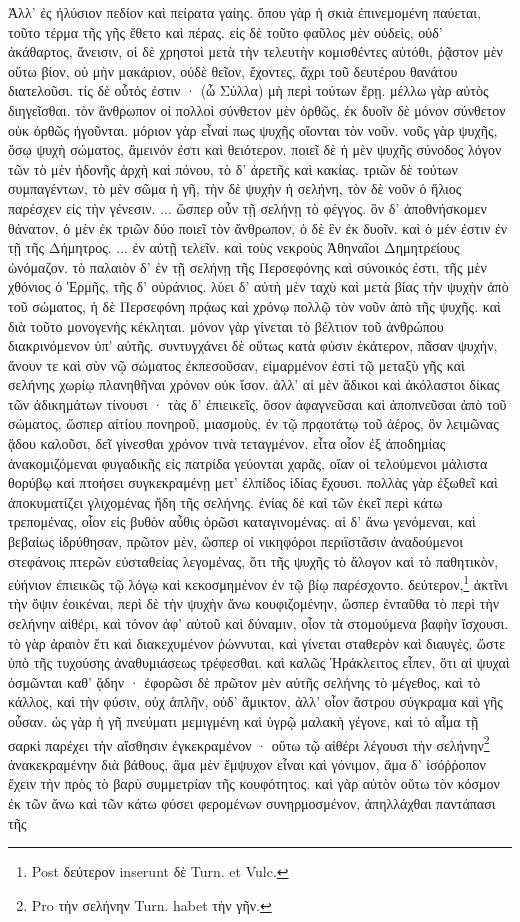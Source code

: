 \documentclass[a4paper, 11pt, oneside, polutonikogreek, german]{article}
\begin{document}
Ἀλλ' ἐς ἠλύσιον πεδίον καὶ πείρατα γαίης. ὅπου γὰρ ἡ σκιὰ ἐπινεμομένη παύεται, τοῦτο τέρμα τῆς γῆς ἔθετο καὶ πέρας. εἰς δὲ τοῦτο φαῦλος μὲν οὐδεὶς, οὐδ' ἀκάθαρτος, ἄνεισιν, οἱ δὲ χρηστοὶ μετὰ τὴν τελευτὴν κομισθέντες αὐτόθι, ῥᾷστον μὲν οὕτω βίον, οὐ μὴν μακάριον, οὐδὲ θεῖον, ἔχοντες, ἄχρι τοῦ δευτέρου θανάτου διατελοῦσι. τίς δὲ οὗτός ἐστιν · (ὦ Σύλλα) μὴ περὶ τούτων ἔρῃ. μέλλω γὰρ αὐτὸς διηγεῖσθαι. τὸν ἄνθρωπον οἱ πολλοὶ σύνθετον μὲν ὀρθῶς, ἐκ δυοῖν δὲ μόνον σύνθετον οὐκ ὀρθῶς ἡγοῦνται. μόριον γὰρ εἶναί πως ψυχῆς οἴονται τὸν νοῦν. νοῦς γὰρ ψυχῆς, ὅσῳ ψυχὴ σώματος, ἄμεινόν ἐστι καὶ θειότερον. ποιεῖ δὲ ἡ μὲν ψυχῆς σύνοδος λόγον τῶν τὸ μὲν ἡδονῆς ἀρχὴ καὶ πόνου, τὸ δ' ἀρετῆς καὶ κακίας. τριῶν δὲ τούτων συμπαγέντων, τὸ μὲν σῶμα ἡ γῆ, τὴν δὲ ψυχὴν ἡ σελήνη, τὸν δὲ νοῦν ὁ ἥλιος παρέσχεν εἰς τὴν γένεσιν. ... ὥσπερ οὖν τῇ σελήνῃ τὸ φέγγος. ὃν δ' ἀποθνήσκομεν θάνατον, ὁ μὲν ἐκ τριῶν δύο ποιεῖ τὸν ἄνθρωπον, ὁ δὲ ἓν ἐκ δυοῖν. καὶ ὁ μέν ἐστιν ἐν τῇ τῆς Δήμητρος. ... ἐν αὐτῇ τελεῖν. καὶ τοὺς νεκροὺς Ἀθηναῖοι Δημητρείους ὠνόμαζον. τὸ παλαιὸν δ' ἐν τῇ σελήνῃ τῆς Περσεφόνης καὶ σύνοικός ἐστι, τῆς μὲν χθόνιος ὁ Ἑρμῆς, τῆς δ' οὐράνιος. λύει δ' αὐτὴ μὲν ταχὺ καὶ μετὰ βίας τὴν ψυχὴν ἀπὸ τοῦ σώματος, ἡ δὲ Περσεφόνη πρᾴως καὶ χρόνῳ πολλῷ τὸν νοῦν ἀπὸ τῆς ψυχῆς. καὶ διὰ τοῦτο μονογενὴς κέκληται. μόνον γὰρ γίνεται τὸ βέλτιον τοῦ ἀνθρώπου διακρινόμενον ὑπ' αὐτῆς. συντυγχάνει δὲ οὕτως κατὰ φύσιν ἑκάτερον, πᾶσαν ψυχὴν, ἄνουν τε καὶ σὺν νῷ σώματος ἐκπεσοῦσαν, εἱμαρμένον ἐστὶ τῷ μεταξὺ γῆς καὶ σελήνης χωρίῳ πλανηθῆναι χρόνον οὐκ ἴσον. ἀλλ' αἱ μὲν ἄδικοι καὶ ἀκόλαστοι δίκας τῶν ἀδικημάτων τίνουσι · τὰς δ' ἐπιεικεῖς, ὅσον ἀφαγνεῦσαι καὶ ἀποπνεῦσαι ἀπὸ τοῦ σώματος, ὥσπερ αἰτίου πονηροῦ, μιασμοὺς, ἐν τῷ πρᾳοτάτῳ τοῦ ἀέρος, ὃν λειμῶνας ᾅδου καλοῦσι, δεῖ γίνεσθαι χρόνον τινὰ τεταγμένον. εἶτα οἷον ἐξ ἀποδημίας ἀνακομιζόμεναι φυγαδικῆς εἰς πατρίδα γεύονται χαρᾶς, οἵαν οἱ τελούμενοι μάλιστα θορύβῳ καὶ πτοήσει συγκεκραμένῃ μετ' ἐλπίδος ἰδίας ἔχουσι. πολλὰς γὰρ ἐξωθεῖ καὶ ἀποκυματίζει γλιχομένας ἤδη τῆς σελήνης. ἐνίας δὲ καὶ τῶν ἐκεῖ περὶ κάτω τρεπομένας, οἷον εἰς βυθὸν αὖθις ὁρῶσι καταγινομένας. αἱ δ' ἄνω γενόμεναι, καὶ βεβαίως ἱδρύθησαν, πρῶτον μὲν, ὥσπερ οἱ νικηφόροι περιϊστᾶσιν ἀναδούμενοι στεφάνοις πτερῶν εὐσταθείας λεγομένας, ὅτι τῆς ψυχῆς τὸ ἄλογον καὶ τὸ παθητικὸν, εὐήνιον ἐπιεικῶς τῷ λόγῳ καὶ κεκοσμημένον ἐν τῷ βίῳ παρέσχοντο. δεύτερον,\footnote{Post δεύτερον inserunt δὲ Turn. et Vulc.} ἀκτῖνι τὴν ὄψιν ἐοικέναι, περὶ δὲ τὴν ψυχὴν ἄνω κουφιζομένην, ὥσπερ ἐνταῦθα τὸ περὶ τὴν σελήνην αἰθέρι, καὶ τόνον ἀφ' αὑτοῦ καὶ δύναμιν, οἷον τὰ στομούμενα βαφὴν ἴσχουσι. τὸ γὰρ ἀραιὸν ἔτι καὶ διακεχυμένον ῥώννυται, καὶ γίνεται σταθερὸν καὶ διαυγὲς, ὥστε ὑπὸ τῆς τυχούσης ἀναθυμιάσεως τρέφεσθαι. καὶ καλῶς Ἡράκλειτος εἶπεν, ὅτι αἱ ψυχαὶ ὀσμῶνται καθ' ᾅδην · ἐφορῶσι δὲ πρῶτον μὲν αὐτῆς σελήνης τὸ μέγεθος, καὶ τὸ κάλλος, καὶ τὴν φύσιν, οὐχ ἁπλῆν, οὐδ' ἄμικτον, ἀλλ' οἷον ἄστρου σύγκραμα καὶ γῆς οὖσαν. ὡς γὰρ ἡ γῆ πνεύματι μεμιγμένη καὶ ὑγρῷ μαλακὴ γέγονε, καὶ τὸ αἷμα τῇ σαρκὶ παρέχει τὴν αἴσθησιν ἐγκεκραμένον · οὕτω τῷ αἰθέρι λέγουσι τὴν σελήνην\footnote{Pro τὴν σελήνην Turn. habet τὴν γῆν.} ἀνακεκραμένην διὰ βάθους, ἅμα μὲν ἔμψυχον εἶναι καὶ γόνιμον, ἅμα δ' ἰσόῤῥοπον ἔχειν τὴν πρὸς τὸ βαρὺ συμμετρίαν τῆς κουφότητος. καὶ γὰρ αὐτὸν οὕτω τὸν κόσμον ἐκ τῶν ἄνω καὶ τῶν κάτω φύσει φερομένων συνηρμοσμένον, ἀπηλλάχθαι παντάπασι τῆς 
\end{document}
